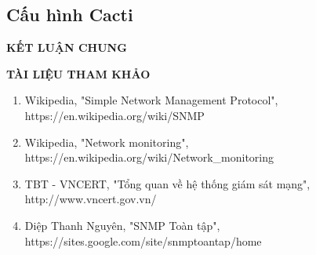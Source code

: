 \documentclass[12pt,oneside,a4paper,reqno]{report}
\begin{document}
\begin{large}
\subsection{Cấu hình Cacti}

\newpage
\vspace*{0.2cm}
\centerline{\Large\bf KẾT LUẬN CHUNG}
\vspace*{0.5cm}

\newpage
\vspace*{0.2cm}
\centerline{\Large\bf TÀI LIỆU THAM KHẢO}
\vspace*{0.5cm}

%
\begin{enumerate}
\item{Wikipedia, "Simple Network Management Protocol", https://en.wikipedia.org/wiki/SNMP}
\item{Wikipedia, "Network monitoring", https://en.wikipedia.org/wiki/Network\_monitoring}
\item{TBT - VNCERT, "Tổng quan về hệ thống giám sát mạng", http://www.vncert.gov.vn/}
\item{Diệp Thanh Nguyên, "SNMP Toàn tập", https://sites.google.com/site/snmptoantap/home}
\end{enumerate}
	
\end{large}		
\end{document}
